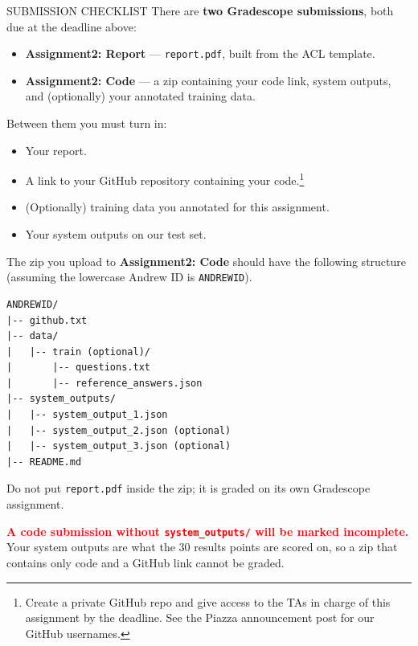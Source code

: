 \documentclass[11pt]{article}
\begin{document}
\begin{deliverables}{SUBMISSION CHECKLIST}
There are \textbf{two Gradescope submissions}, both due at the deadline above:
\begin{itemize}[nosep, leftmargin=1.6em]
  \item \textbf{Assignment2: Report} --- \texttt{report.pdf}, built from the ACL template.
  \item \textbf{Assignment2: Code} --- a zip containing your code link, system outputs, and
    (optionally) your annotated training data.
\end{itemize}
\vspace{0.4em}
Between them you must turn in:
\begin{itemize}[nosep, leftmargin=1.6em]
  \item Your report.
  \item A link to your GitHub repository containing your code.\footnote{Create a private GitHub repo
    and give access to the TAs in charge of this assignment by the deadline. See the Piazza
    announcement post for our GitHub usernames.}
  \item (Optionally) training data you annotated for this assignment.
  \item Your system outputs on our test set.
\end{itemize}
\end{deliverables}

\noindent The zip you upload to \textbf{Assignment2: Code} should have the following structure
(assuming the lowercase Andrew ID is \texttt{ANDREWID}).

\begin{codebox}
\begin{verbatim}
ANDREWID/
|-- github.txt
|-- data/
|   |-- train (optional)/
|       |-- questions.txt
|       |-- reference_answers.json
|-- system_outputs/
|   |-- system_output_1.json
|   |-- system_output_2.json (optional)
|   |-- system_output_3.json (optional)
|-- README.md
\end{verbatim}
\end{codebox}

\noindent Do not put \texttt{report.pdf} inside the zip; it is graded on its own Gradescope
assignment.

\vspace{0.5em}
\noindent\textcolor{red}{\textbf{A code submission without \texttt{system\_outputs/} will be marked
incomplete.}} Your system outputs are what the 30 results points are scored on, so a zip that
contains only code and a GitHub link cannot be graded.
\end{document}
